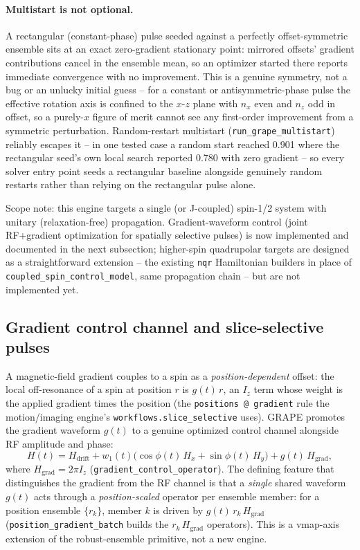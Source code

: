 \documentclass[11pt,oneside]{report}
\newcommand{\code}[1]{\texttt{#1}}
\begin{document}
\paragraph{Multistart is not optional.} A rectangular (constant-phase) pulse
seeded against a perfectly offset-symmetric ensemble sits at an exact
zero-gradient stationary point: mirrored offsets' gradient contributions
cancel in the ensemble mean, so an optimizer started there reports immediate
convergence with no improvement. This is a genuine symmetry, not a bug or an
unlucky initial guess -- for a constant or antisymmetric-phase pulse the
effective rotation axis is confined to the \(x\)-\(z\) plane with \(n_x\) even
and \(n_z\) odd in offset, so a purely-\(x\) figure of merit cannot see any
first-order improvement from a symmetric perturbation. Random-restart
multistart (\code{run\_grape\_multistart}) reliably escapes it -- in one
tested case a random start reached 0.901 where the rectangular seed's own
local search reported 0.780 with zero gradient -- so every solver entry point
seeds a rectangular baseline alongside genuinely random restarts rather than
relying on the rectangular pulse alone.

Scope note: this engine targets a single (or J-coupled) spin-1/2 system with
unitary (relaxation-free) propagation. Gradient-waveform control (joint
RF+gradient optimization for spatially selective pulses) is now implemented and
documented in the next subsection; higher-spin quadrupolar targets are designed
as a straightforward extension -- the existing \code{nqr} Hamiltonian builders
in place of \code{coupled\_spin\_control\_model}, same propagation chain -- but
are not implemented yet.

\subsection{Gradient control channel and slice-selective pulses}
\label{sec:grape-gradient-channel}

A magnetic-field gradient couples to a spin as a \emph{position-dependent}
offset: the local off-resonance of a spin at position \(r\) is \(g(t)\,r\), an
\(I_z\) term whose weight is the applied gradient times the position (the
\code{positions @ gradient} rule the motion/imaging engine's
\code{workflows.slice\_selective} uses). GRAPE promotes the gradient waveform \(g(t)\)
to a genuine optimized control channel alongside RF amplitude and phase:
\[
  H(t) = H_\text{drift} + w_1(t)\big(\cos\phi(t)\,H_x + \sin\phi(t)\,H_y\big)
         + g(t)\,H_\text{grad},
\]
where \(H_\text{grad}=2\pi I_z\) (\code{gradient\_control\_operator}). The
defining feature that distinguishes the gradient from the RF channel is that a
\emph{single} shared waveform \(g(t)\) acts through a \emph{position-scaled}
operator per ensemble member: for a position ensemble
\(\{r_k\}\), member \(k\) is driven by \(g(t)\,r_k\,H_\text{grad}\)
(\code{position\_gradient\_batch} builds the \(r_k\,H_\text{grad}\) operators).
This is a vmap-axis extension of the robust-ensemble primitive, not a new
engine.
\end{document}
